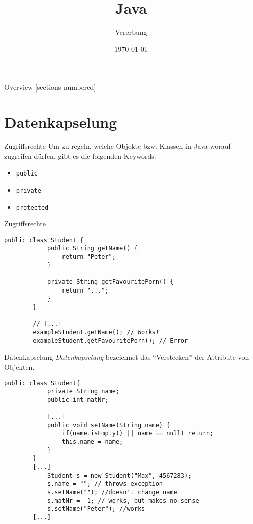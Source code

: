 

\usepackage{csquotes}
\usepackage{ulem}


\title{Java}
\subtitle{Vererbung}
\date{\today}



\begin{frame}
	\titlepage
\end{frame}

\begin{frame}{Overview}
	[sections numbered]
	\tableofcontents
\end{frame}

\section{Datenkapselung}
\begin{frame}[fragile]{Zugriffsrechte}
    Um zu regeln, welche Objekte bzw. Klassen in Java worauf zugreifen dürfen, gibt es die folgenden Keywords:
    \begin{itemize}[<+->]
		\item \texttt{public}
		\item \texttt{private}
		\item \texttt{protected}
	\end{itemize}
\end{frame}
	
\begin{frame}[fragile]{Zugriffsrechte}
	\begin{lstlisting}[gobble=8]
		public class Student {
			public String getName() {
				return "Peter";
			}
			
			private String getFavouritePorn() {
				return "...";
			}
		}
	
		// [...]
		exampleStudent.getName(); // Works!
		exampleStudent.getFavouritePorn(); // Error
	\end{lstlisting}
\end{frame}

\begin{frame}[fragile]{Datenkapselung}
    \textit{Datenkapselung} bezeichnet das \enquote{Verstecken} der Attribute von Objekten. \\
    \begin{lstlisting}[gobble=8]
        public class Student{
            private String name;
            public int matNr;

            [...]
            public void setName(String name) {
                if(name.isEmpty() || name == null) return;
                this.name = name;
            }
        }
        [...]
            Student s = new Student("Max", 4567283);
            s.name = ""; // throws exception
            s.setName(""); //doesn't change name
            s.matNr = -1; // works, but makes no sense
            s.setName("Peter"); //works
        [...]
    \end{lstlisting}
\end{frame}

